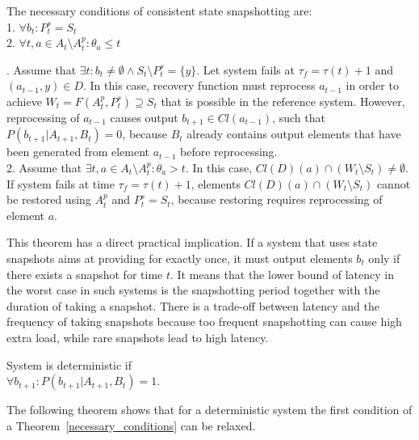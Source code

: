 \begin{theorem}
\label{necessary_conditions}
The necessary conditions of consistent state snapshotting are:\\
1. $\forall{b_t}:P^{s}_t=S_t$\\
2. $\forall{t, a}\in{A_t \setminus A^{p}_t} : \theta_a \leq t$
\end{theorem}
\begin{sketch}
$ $. Assume that $\exists{t}:b_t\neq{\emptyset} \wedge S_{t}\setminus{P^{s}_t}=\{y\}$. Let system fails at $\tau_f = \tau(t)+1$ and $(a_{t-1},y)\in{D}$. In this case, recovery function must reprocess $a_{t-1}$ in order to achieve $W_t=F(A^{p}_t,P^{s}_t)\supseteq{S_t}$ that is possible in the reference system. However, reprocessing of $a_{t-1}$ causes output $b_{t+1}\in{Cl(a_{t-1})}$, such that $P(b_{t+1}|A_{t+1},B_{t})=0$, because $B_{t}$ already contains output elements that have been generated from element $a_{t-1}$ before reprocessing. \\
2. Assume that $\exists{}t,a \in{A_t \setminus A^{p}_t}:\theta_{a}>t$. In this case, $Cl(D)(a) \cap (W_t \setminus{S_t}) \neq \emptyset$. If system fails at time $\tau_f=\tau(t)+1$, elements $Cl(D)(a) \cap (W_t \setminus{S_t})$ cannot be restored using $A^{p}_t$ and $P^{s}_t=S_t$, because restoring requires reprocessing of element $a$.
\end{sketch}

This theorem has a direct practical implication. If a system that uses state snapshots aims at providing for exactly once, it must output elements $b_t$ only if there exists a snapshot for time $t$. It means that the lower bound of latency in the worst case in such systems is the snapshotting period together with the duration of taking a snapshot. There is a trade-off between latency and the frequency of taking snapshots because too frequent snapshotting can cause high extra load, while rare snapshots lead to high latency.

\begin{definition}{System is deterministic}
if\\ 
$\forall{b_{t+1}}:P(b_{t+1}|A_{t+1},B_t)=1$.
\end{definition}

The following theorem shows that for a deterministic system the first condition of a Theorem~\ref{necessary_conditions} can be relaxed. 

